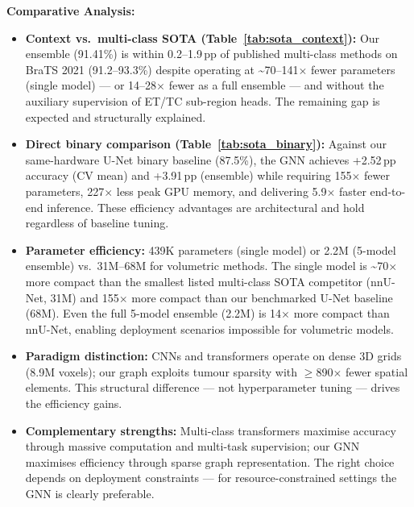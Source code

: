 \documentclass{article}
\begin{document}
\textbf{Comparative Analysis:}

\begin{itemize}
    \item \textbf{Context vs.\ multi-class SOTA (Table~\ref{tab:sota_context}):} Our ensemble (91.41\%) is within 0.2--1.9\,pp of published multi-class methods on BraTS 2021 (91.2--93.3\%) despite operating at \textasciitilde70--141$\times$ fewer parameters (single model) — or 14--28$\times$ fewer as a full ensemble — and without the auxiliary supervision of ET/TC sub-region heads. The remaining gap is expected and structurally explained.

    \item \textbf{Direct binary comparison (Table~\ref{tab:sota_binary}):} Against our same-hardware U-Net binary baseline (87.5\%), the GNN achieves +2.52\,pp accuracy (CV mean) and +3.91\,pp (ensemble) while requiring 155$\times$ fewer parameters, 227$\times$ less peak GPU memory, and delivering 5.9$\times$ faster end-to-end inference. These efficiency advantages are architectural and hold regardless of baseline tuning.

    \item \textbf{Parameter efficiency:} 439K parameters (single model) or 2.2M (5-model ensemble) vs.\ 31M--68M for volumetric methods. The single model is \textasciitilde70$\times$ more compact than the smallest listed multi-class SOTA competitor (nnU-Net, 31M) and 155$\times$ more compact than our benchmarked U-Net baseline (68M). Even the full 5-model ensemble (2.2M) is 14$\times$ more compact than nnU-Net, enabling deployment scenarios impossible for volumetric models.

    \item \textbf{Paradigm distinction:} CNNs and transformers operate on dense 3D grids (8.9M voxels); our graph exploits tumour sparsity with $\geq$890$\times$ fewer spatial elements. This structural difference — not hyperparameter tuning — drives the efficiency gains.

    \item \textbf{Complementary strengths:} Multi-class transformers maximise accuracy through massive computation and multi-task supervision; our GNN maximises efficiency through sparse graph representation. The right choice depends on deployment constraints — for resource-constrained settings the GNN is clearly preferable.
\end{itemize}

\vspace{5mm}
\end{document}
